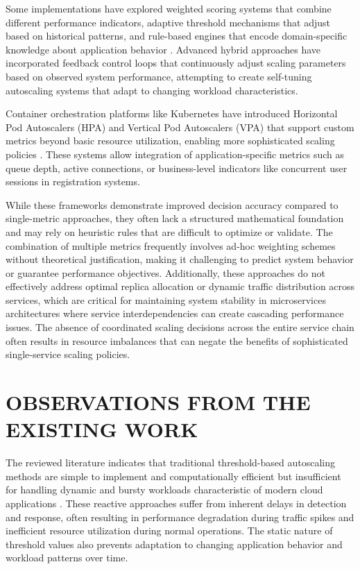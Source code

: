 Some implementations have explored weighted scoring systems that combine different performance indicators, adaptive threshold mechanisms that adjust based on historical patterns, and rule-based engines that encode domain-specific knowledge about application behavior \cite{fourati2021}. Advanced hybrid approaches have incorporated feedback control loops that continuously adjust scaling parameters based on observed system performance, attempting to create self-tuning autoscaling systems that adapt to changing workload characteristics.

Container orchestration platforms like Kubernetes have introduced Horizontal Pod Autoscalers (HPA) and Vertical Pod Autoscalers (VPA) that support custom metrics beyond basic resource utilization, enabling more sophisticated scaling policies \cite{wang2024}. These systems allow integration of application-specific metrics such as queue depth, active connections, or business-level indicators like concurrent user sessions in registration systems.

While these frameworks demonstrate improved decision accuracy compared to single-metric approaches, they often lack a structured mathematical foundation and may rely on heuristic rules that are difficult to optimize or validate. The combination of multiple metrics frequently involves ad-hoc weighting schemes without theoretical justification, making it challenging to predict system behavior or guarantee performance objectives. Additionally, these approaches do not effectively address optimal replica allocation or dynamic traffic distribution across services, which are critical for maintaining system stability in microservices architectures where service interdependencies can create cascading performance issues. The absence of coordinated scaling decisions across the entire service chain often results in resource imbalances that can negate the benefits of sophisticated single-service scaling policies.

\section{OBSERVATIONS FROM THE EXISTING WORK}

The reviewed literature indicates that traditional threshold-based autoscaling methods are simple to implement and computationally efficient but insufficient for handling dynamic and bursty workloads characteristic of modern cloud applications \cite{khaleq2021}. These reactive approaches suffer from inherent delays in detection and response, often resulting in performance degradation during traffic spikes and inefficient resource utilization during normal operations. The static nature of threshold values also prevents adaptation to changing application behavior and workload patterns over time.

